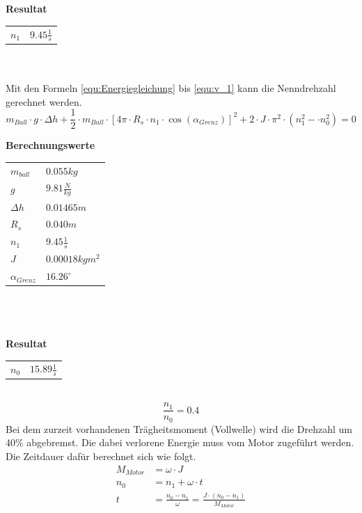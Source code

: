 \\
\\
\textbf{Resultat}\\
\begin{tabular}{ll}
    \rule{0pt}{11pt} $n_1$ & $9.45 \frac{1}{s}$ \\
\end{tabular}\\
\\
Mit den Formeln \ref{equ:Energiegleichung} bis \ref{equ:v_1} kann die Nenndrehzahl gerechnet werden.
\begin{equation}
    m_{Ball} \cdot g \cdot \Delta h + \frac{1}{2} \cdot m_{Ball} \cdot \left[4\pi 
    \cdot R_s \cdot n_1 \cdot \cos(\alpha_{Grenz})\right]^2 + 2 \cdot J \cdot \pi^2 
    \cdot \left(n_1^2-\cdot n_0^2\right) = 0
\end{equation}

\textbf{Berechnungswerte}\\
\begin{tabular}{ll}
    \rule{0pt}{11pt} $m_{ball}$ & $0.055 kg$ \\
    \rule{0pt}{11pt} $g$ & $9.81 \frac{N}{kg}$ \\
    \rule{0pt}{11pt} $\Delta h$ & $0.01465 m$ \\
    \rule{0pt}{11pt} $R_s$ & $0.040 m$ \\
    \rule{0pt}{11pt} $n_1$ & $9.45\frac{1}{s}$ \\
    \rule{0pt}{11pt} $J$ & $0.00018 kgm^2$ \\
    \rule{0pt}{11pt} $\alpha_{Grenz}$ & $16.26^\circ$ \\
\end{tabular}\\
\\
\\
\textbf{Resultat}\\
\begin{tabular}{ll}
    \rule{0pt}{11pt} $n_0$ & $15.89 \frac{1}{s}$ \\
\end{tabular}\\
\begin{equation}
    \frac{n_1}{n_0} = 0.4 \label{equ_Prozentwert}
\end{equation}
Bei dem zurzeit vorhandenen Trägheitsmoment (Vollwelle) wird die Drehzahl um 40\% 
abgebremst. Die dabei verlorene Energie muss vom Motor zugeführt werden. 
Die Zeitdauer dafür berechnet sich wie folgt.
\begin{align}
    M_{Motor} &= \omega \cdot J \\
    n_0 &= n_1 + \omega \cdot t \\
    t &= \frac{n_0 - n_1}{\omega} = \frac{J \cdot \left(n_0 - n_1\right)}{M_{Motor}}
\end{align}

